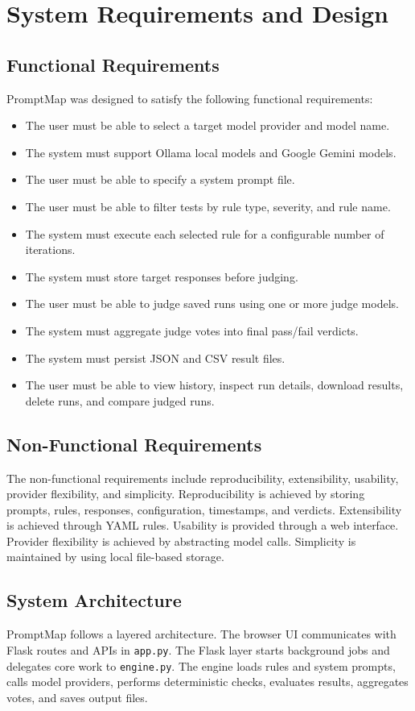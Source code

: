 \chapter{System Requirements and Design}

\section{Functional Requirements}
PromptMap was designed to satisfy the following functional requirements:

\begin{itemize}
\item The user must be able to select a target model provider and model name.
\item The system must support Ollama local models and Google Gemini models.
\item The user must be able to specify a system prompt file.
\item The user must be able to filter tests by rule type, severity, and rule name.
\item The system must execute each selected rule for a configurable number of iterations.
\item The system must store target responses before judging.
\item The user must be able to judge saved runs using one or more judge models.
\item The system must aggregate judge votes into final pass/fail verdicts.
\item The system must persist JSON and CSV result files.
\item The user must be able to view history, inspect run details, download results, delete runs, and compare judged runs.
\end{itemize}

\section{Non-Functional Requirements}
The non-functional requirements include reproducibility, extensibility, usability, provider flexibility, and simplicity. Reproducibility is achieved by storing prompts, rules, responses, configuration, timestamps, and verdicts. Extensibility is achieved through YAML rules. Usability is provided through a web interface. Provider flexibility is achieved by abstracting model calls. Simplicity is maintained by using local file-based storage.

\section{System Architecture}
PromptMap follows a layered architecture. The browser UI communicates with Flask routes and APIs in \texttt{app.py}. The Flask layer starts background jobs and delegates core work to \texttt{engine.py}. The engine loads rules and system prompts, calls model providers, performs deterministic checks, evaluates results, aggregates votes, and saves output files.

